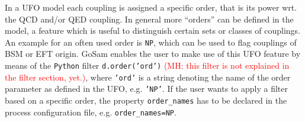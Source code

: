 \documentclass[11pt,a4paper]{refrep}
\newcommand{\gosam}{{\sc GoSam}\xspace}
\newcommand{\python}{{\tt Python}\xspace}
\begin{document}
In a UFO model each coupling is assigned a specific order, that is its power wrt. the QCD and/or QED coupling. In general more ``orders'' can be defined in the model, a feature which is useful to distinguish certain sets or classes of couplings. An example for an often used order is \texttt{NP}, which can be used to flag couplings of BSM or EFT origin. \gosam enables the user to make use of this UFO feature by means of the \python filter \texttt{d.order('ord')} \textcolor{red}{(MH: this filter is not explained in the filter section, yet.)}, where \texttt{'ord'} is a string denoting the name of the order parameter as defined in the UFO, e.g. \texttt{'NP'}. If the user wants to apply a filter based on a specific order, the property \texttt{order\_names} has to be declared in the process configuration file, e.g. \texttt{order\_names=NP}.
\end{document}
